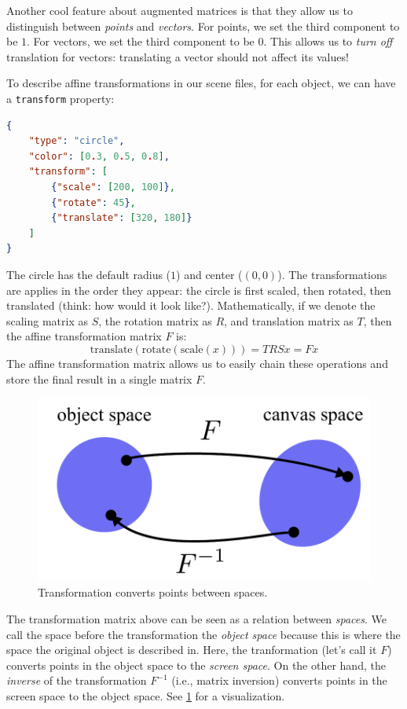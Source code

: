Another cool feature about augmented matrices is that they allow us to distinguish between \emph{points} and \emph{vectors}. For points, we set the third component to be $1$. For vectors, we set the third component to be $0$. This allows us to \emph{turn off} translation for vectors: translating a vector should not affect its values! 

To describe affine transformations in our scene files, for each object, we can have a \lstinline{transform} property:
\begin{lstlisting}[language=json]
{
    "type": "circle",
    "color": [0.3, 0.5, 0.8],
    "transform": [
        {"scale": [200, 100]},
        {"rotate": 45},
        {"translate": [320, 180]}
    ]
}
\end{lstlisting}
The circle has the default radius ($1$) and center ($(0, 0)$). The transformations are applies in the order they appear: the circle is first scaled, then rotated, then translated (think: how would it look like?). Mathematically, if we denote the scaling matrix as $S$, the rotation matrix as $R$, and translation matrix as $T$, then the affine transformation matrix $F$ is:
\begin{equation}
    \text{translate}(\text{rotate}(\text{scale}(x))) = T R S x = F x
\end{equation}
The affine transformation matrix allows us to easily chain these operations and store the final result in a single matrix $F$.

\begin{figure}[ht]
    \centering
    \includegraphics[width=0.5\linewidth]{imgs/spaces.pdf}
    \caption{Transformation converts points between spaces.}
    \label{fig:spaces}
\end{figure}

The transformation matrix above can be seen as a relation between \emph{spaces}. We call the space before the transformation the \emph{object space} because this is where the space the original object is described in. Here, the tranformation (let's call it $F$) converts points in the object space to the \emph{screen space}. On the other hand, the \emph{inverse} of the transformation $F^{-1}$ (i.e., matrix inversion) converts points in the screen space to the object space. See \cref{fig:spaces} for a visualization.

